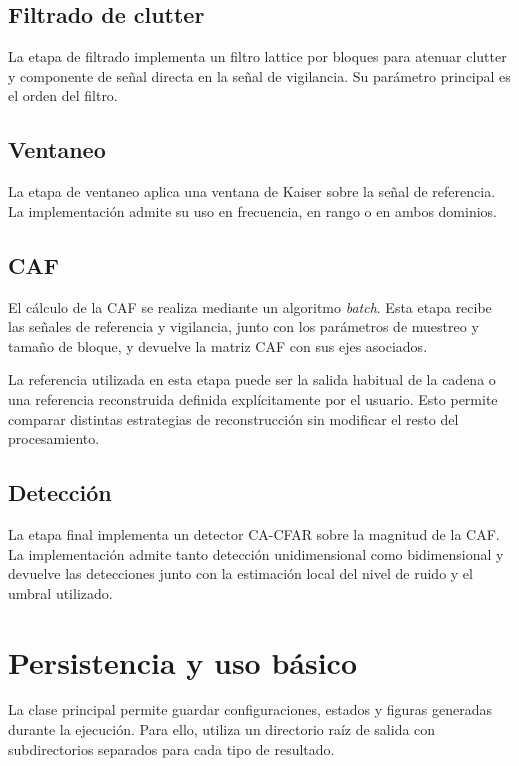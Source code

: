\subsection{Filtrado de clutter}

La etapa de filtrado implementa un filtro lattice por bloques para atenuar clutter y componente de señal directa en la señal de vigilancia. Su parámetro principal es el orden del filtro.

\subsection{Ventaneo}

La etapa de ventaneo aplica una ventana de Kaiser sobre la señal de referencia. La implementación admite su uso en frecuencia, en rango o en ambos dominios.

\subsection{CAF}

El cálculo de la CAF se realiza mediante un algoritmo \textit{batch}. Esta etapa recibe las señales de referencia y vigilancia, junto con los parámetros de muestreo y tamaño de bloque, y devuelve la matriz CAF con sus ejes asociados.

La referencia utilizada en esta etapa puede ser la salida habitual de la cadena o una referencia reconstruida definida explícitamente por el usuario. Esto permite comparar distintas estrategias de reconstrucción sin modificar el resto del procesamiento.

\subsection{Detección}

La etapa final implementa un detector CA-CFAR sobre la magnitud de la CAF. La implementación admite tanto detección unidimensional como bidimensional y devuelve las detecciones junto con la estimación local del nivel de ruido y el umbral utilizado.

\section{Persistencia y uso básico}

La clase principal permite guardar configuraciones, estados y figuras generadas durante la ejecución. Para ello, utiliza un directorio raíz de salida con subdirectorios separados para cada tipo de resultado.

